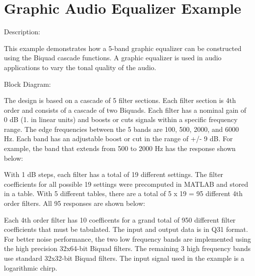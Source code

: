 \hypertarget{group___g_e_q5_band}{\section{Graphic Audio Equalizer Example}
\label{group___g_e_q5_band}
}
\begin{DoxyParagraph}{Description\-: }

\end{DoxyParagraph}
\begin{DoxyParagraph}{}
This example demonstrates how a 5-\/band graphic equalizer can be constructed using the Biquad cascade functions. A graphic equalizer is used in audio applications to vary the tonal quality of the audio.
\end{DoxyParagraph}
\begin{DoxyParagraph}{Block Diagram\-:}

\end{DoxyParagraph}
\begin{DoxyParagraph}{}
The design is based on a cascade of 5 filter sections.  Each filter section is 4th order and consists of a cascade of two Biquads. Each filter has a nominal gain of 0 d\-B (1. in linear units) and boosts or cuts signals within a specific frequency range. The edge frequencies between the 5 bands are 100, 500, 2000, and 6000 Hz. Each band has an adjustable boost or cut in the range of +/-\/ 9 d\-B. For example, the band that extends from 500 to 2000 Hz has the response shown below\-: 
\end{DoxyParagraph}
\begin{DoxyParagraph}{}
 
\end{DoxyParagraph}
\begin{DoxyParagraph}{}
With 1 d\-B steps, each filter has a total of 19 different settings. The filter coefficients for all possible 19 settings were precomputed in M\-A\-T\-L\-A\-B and stored in a table. With 5 different tables, there are a total of 5 x 19 = 95 different 4th order filters. All 95 responses are shown below\-: 
\end{DoxyParagraph}
\begin{DoxyParagraph}{}
 
\end{DoxyParagraph}
\begin{DoxyParagraph}{}
Each 4th order filter has 10 coefficents for a grand total of 950 different filter coefficients that must be tabulated. The input and output data is in Q31 format. For better noise performance, the two low frequency bands are implemented using the high precision 32x64-\/bit Biquad filters. The remaining 3 high frequency bands use standard 32x32-\/bit Biquad filters. The input signal used in the example is a logarithmic chirp. 
\end{DoxyParagraph}
